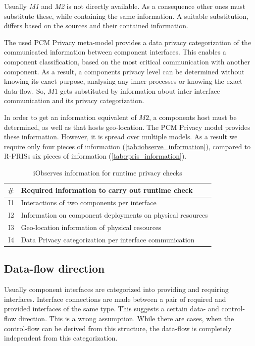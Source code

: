 Usually \textit{M1} and \textit{M2} is not directly available. As a consequence other ones must substitute these, while containing the same information. A suitable substitution, differs based on the sources and their contained information.

The used PCM Privacy meta-model provides a data privacy categorization of the communicated information between component interfaces. This enables a component classification, based on the most critical communication with another component. As a result, a components privacy level can be determined without knowing its exact purpose, analysing any inner processes or knowing the exact data-flow. So, $M1$ gets substituted by information about inter interface communication and its privacy categorization.

In order to get an information equivalent of $M2$, a components host must be determined, as well as that hosts geo-location. The PCM Privacy model provides these information. However, it is spread over multiple models. As a result we require only four pieces of information (\autoref{tab:iobserve_information}), compared to R-PRISs six pieces of information (\autoref{tab:rpris_information}).

\begin{table}[h]
	\centering
	\begin{tabular}{r | l}
		\hline
		\textbf{\#} & \textbf{Required information to carry out runtime check}\\
		\hline
		I1 & Interactions of two components per interface \\
		I2 & Information on component deployments on physical resources \\
		I3 & Geo-location information of physical resources \\
		I4 & Data Privacy categorization per interface communication \\
		\hline
	\end{tabular}
	\caption{iObserves information for runtime privacy checks}
	\label{tab:iobserve_information}
\end{table}

\subsection{Data-flow direction}
\label{sec:PrivacyAnalysis:theory:dataflow}
Usually component interfaces are categorized into providing and requiring interfaces. Interface connections are made between a pair of required and provided interfaces of the same type. This suggests a certain data- and control-flow direction. This is a wrong assumption. While there are cases, when the control-flow can be derived from this structure, the data-flow is completely independent from this categorization.


